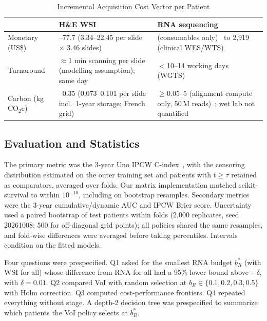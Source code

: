 \documentclass[journal,twoside]{IEEEtran}
\begin{document}
\begin{table}[t]
\centering
\caption{Incremental Acquisition Cost Vector per Patient}
\label{tab:cost}
\setlength{\tabcolsep}{3pt}
\begin{tabular}{@{}>{\raggedright\arraybackslash}p{1.5cm}>{\raggedright\arraybackslash}p{3.1cm}>{\raggedright\arraybackslash}p{3.15cm}@{}}
\toprule
 & H\&E WSI & RNA sequencing \\
\midrule
Monetary (US\$) & 11.6--77.7 (3.34--22.45 per slide $\times$ 3.46 slides)~\cite{ardon2023} & 300 (consumables only)~\cite{altburger2026} to 2,919 (clinical WES/WTS)~\cite{ortendahl2025} \\
Turnaround & $\approx$1 min scanning per slide (modelling assumption); same day~\cite{vafaeisadr2024} & $<$10--14 working days (WGTS)~\cite{cuppen2022} \\
Carbon (kg CO$_2$e) & 0.25--0.35 (0.073--0.101 per slide incl.\ 1-year storage; French grid)~\cite{tilmant2026} & $\ge$0.05--5 (alignment compute only, 50\,M reads)~\cite{grealey2022}; wet lab not quantified \\
\bottomrule
\end{tabular}
\end{table}

\subsection{Evaluation and Statistics}
The primary metric was the 3-year Uno IPCW C-index~\cite{uno2011}, with the censoring distribution estimated on the outer training set and patients with $t \ge \tau$ retained as comparators, averaged over folds. Our matrix implementation matched scikit-survival to within $10^{-10}$, including on bootstrap resamples. Secondary metrics were the 3-year cumulative/dynamic AUC and IPCW Brier score. Uncertainty used a paired bootstrap of test patients within folds (2,000 replicates, seed 20261008; 500 for off-diagonal grid points); all policies shared the same resamples, and fold-wise differences were averaged before taking percentiles. Intervals condition on the fitted models.

Four questions were prespecified. Q1 asked for the smallest RNA budget $b_R^*$ (with WSI for all) whose difference from RNA-for-all had a 95\% lower bound above $-\delta$, with $\delta = 0.01$. Q2 compared VoI with random selection at $b_R \in \{0.1, 0.2, 0.3, 0.5\}$ with Holm correction. Q3 computed cost-performance frontiers. Q4 repeated everything without stage. A depth-2 decision tree was prespecified to summarize which patients the VoI policy selects at $b_R^*$.
\end{document}
